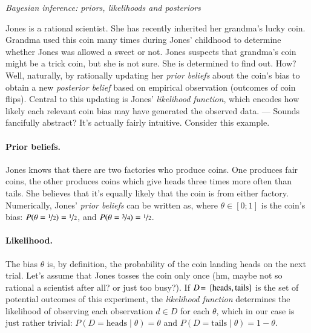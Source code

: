 \documentclass[nobib]{tufte-handout}
\begin{document}
\begin{InfoBox}[]
\centering
\colorbox{mygray}{\centering
  \begin{minipage}{1.0\textwidth}

    \emph{Bayesian inference: priors, likelihoods and posteriors}
    \medskip

    Jones is a rational scientist. She has recently inherited her grandma's lucky coin. Grandma
    used this coin many times during Jones' childhood to determine whether Jones was allowed a
    sweet or not. Jones suspects that grandma's coin might be a trick coin, but she is not
    sure. She is determined to find out. How? Well, naturally, by rationally updating her
    \emph{prior beliefs} about the coin's bias to obtain a new \emph{posterior belief} based on
    empirical observation (outcomes of coin flips). Central to this updating is Jones'
    \emph{likelihood function}, which encodes how likely each relevant coin bias may have
    generated the observed data. --- Sounds fancifully abstract? It's actually fairly intuitive.
    Consider this example.
    
    \paragraph{Prior beliefs.} Jones knows that there are two factories who produce coins. One
    produces fair coins, the other produces coins which give heads three times more often than
    tails. She believes that it's equally likely that the coin is from either factory. Numerically, Jones' \emph{prior beliefs} can be written as, where $\theta \in [0;1]$
    is the coin's bias: $P(\theta = \nicefrac{1}{2}) = \nicefrac{1}{2}$, and $P(\theta =
    \nicefrac{3}{4}) = \nicefrac{1}{2}$.

    \paragraph{Likelihood.} The bias $\theta$ is, by definition, the probability of the coin
    landing heads on the next trial. Let's assume that Jones tosses the coin only once (hm,
    maybe not so rational a scientist after all? or just too busy?). If $D\!=\,\left\{\text{heads}, \text{tails}\right\}$ is the set of potential outcomes of this experiment, the \emph{likelihood
      function} determines the likelihood of observing each observation {$d\!\in D$} for each
    $\theta$, which in our case is just rather trivial: $P(D = \text{heads} \mid \theta) =
    \theta$ and $P(D = \text{tails} \mid \theta) = 1 - \theta$.


\end{minipage}}
\end{InfoBox}
\end{document}
